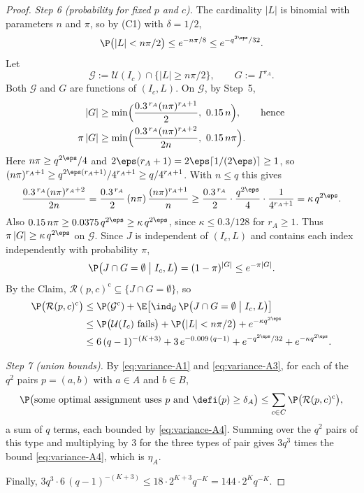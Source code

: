 \begin{proof}
\emph{Step 6 (probability for fixed $p$ and $c$).} The cardinality $|L|$ is binomial with
parameters $n$ and $\pi$, so by (C1) with $\delta=1/2$,
\[
\P\bigl(|L|<n\pi/2\bigr)\le e^{-n\pi/8}\le e^{-q^{2\eps}/32}.
\]
Let
\[
\mathcal G:=\mathcal U(I_c)\cap\{|L|\ge n\pi/2\},\qquad G:=\Gamma^{r_A}.
\]
Both $\mathcal G$ and $G$ are functions of $(I_c,L)$. On $\mathcal G$, by Step~5,
\begin{align*}
|G|&\ge\min\Bigl(\frac{0.3^{\,r_A}(n\pi)^{r_A+1}}2,\ 0.15\,n\Bigr),\qquad\text{hence}\\
\pi\,|G|&\ge\min\Bigl(\frac{0.3^{\,r_A}(n\pi)^{r_A+2}}{2n},\ 0.15\,n\pi\Bigr).
\end{align*}
Here $n\pi\ge q^{2\eps}/4$ and
$2\eps(r_A+1)=2\eps\lceil1/(2\eps)\rceil\ge1$, so
$(n\pi)^{r_A+1}\ge q^{2\eps(r_A+1)}/4^{r_A+1}\ge q/4^{r_A+1}$. With $n\le q$ this gives
\[
\frac{0.3^{\,r_A}(n\pi)^{r_A+2}}{2n}
=\frac{0.3^{\,r_A}}2\,(n\pi)\,\frac{(n\pi)^{r_A+1}}n
\ge\frac{0.3^{\,r_A}}2\cdot\frac{q^{2\eps}}4\cdot\frac1{4^{r_A+1}}=\kappa\,q^{2\eps}.
\]
Also $0.15\,n\pi\ge0.0375\,q^{2\eps}\ge\kappa\,q^{2\eps}$, since $\kappa\le0.3/128$ for
$r_A\ge1$. Thus $\pi\,|G|\ge\kappa\,q^{2\eps}$ on $\mathcal G$. Since $J$ is independent of
$(I_c,L)$ and contains each index independently with probability $\pi$,
\[
\P\bigl(J\cap G=\emptyset\bigm|I_c,L\bigr)=(1-\pi)^{|G|}\le e^{-\pi|G|}.
\]
By the Claim, $\mathcal R(p,c)^{\mathrm c}\subseteq\{J\cap G=\emptyset\}$, so
\begin{align}
\P\bigl(\mathcal R(p,c)^{\mathrm c}\bigr)
&\le\P(\mathcal G^{\mathrm c})
+\E\bigl[\ind_{\mathcal G}\,\P\bigl(J\cap G=\emptyset\bigm|I_c,L\bigr)\bigr]\notag\\
&\le\P\bigl(\mathcal U(I_c)\text{ fails}\bigr)+\P\bigl(|L|<n\pi/2\bigr)
+e^{-\kappa q^{2\eps}}\notag\\
&\le6\,(q-1)^{-(K+3)}+3\,e^{-0.009\,(q-1)}+e^{-q^{2\eps}/32}+e^{-\kappa q^{2\eps}}.
\label{eq:variance-A4}
\end{align}

\emph{Step 7 (union bounds).} By \eqref{eq:variance-A1} and \eqref{eq:variance-A3}, for
each of the $q^2$ pairs $p=(a,b)$ with $a\in A$ and $b\in B$,
\[
\P\bigl(\text{some optimal assignment uses $p$ and }\defi(p)\ge\delta_A\bigr)
\le\sum_{c\in C}\P\bigl(\mathcal R(p,c)^{\mathrm c}\bigr),
\]
a sum of $q$ terms, each bounded by \eqref{eq:variance-A4}. Summing over the $q^2$ pairs of
this type and multiplying by $3$ for the three types of pair gives $3q^3$ times the bound
\eqref{eq:variance-A4}, which is $\eta_A$.

Finally, $3q^3\cdot6\,(q-1)^{-(K+3)}\le18\cdot2^{K+3}q^{-K}=144\cdot2^Kq^{-K}$.
\end{proof}

